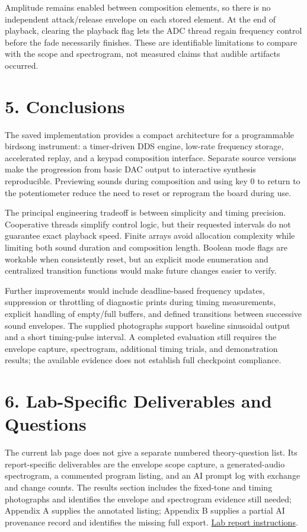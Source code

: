 \documentclass[11pt,letterpaper]{article}
\begin{document}
Amplitude remains enabled between composition elements, so there is no independent attack/release envelope on each stored element. At the end of playback, clearing the playback flag lets the ADC thread regain frequency control before the fade necessarily finishes. These are identifiable limitations to compare with the scope and spectrogram, not measured claims that audible artifacts occurred.

\section*{5. Conclusions}

The saved implementation provides a compact architecture for a programmable birdsong instrument: a timer-driven DDS engine, low-rate frequency storage, accelerated replay, and a keypad composition interface. Separate source versions make the progression from basic DAC output to interactive synthesis reproducible. Previewing sounds during composition and using key 0 to return to the potentiometer reduce the need to reset or reprogram the board during use.

The principal engineering tradeoff is between simplicity and timing precision. Cooperative threads simplify control logic, but their requested intervals do not guarantee exact playback speed. Finite arrays avoid allocation complexity while limiting both sound duration and composition length. Boolean mode flags are workable when consistently reset, but an explicit mode enumeration and centralized transition functions would make future changes easier to verify.

Further improvements would include deadline-based frequency updates, suppression or throttling of diagnostic prints during timing measurements, explicit handling of empty/full buffers, and defined transitions between successive sound envelopes. The supplied photographs support baseline sinusoidal output and a short timing-pulse interval. A completed evaluation still requires the envelope capture, spectrogram, additional timing trials, and demonstration results; the available evidence does not establish full checkpoint compliance.

\section*{6. Lab-Specific Deliverables and Questions}

The current lab page does not give a separate numbered theory-question list. Its report-specific deliverables are the envelope scope capture, a generated-audio spectrogram, a commented program listing, and an AI prompt log with exchange and change counts. The results section includes the fixed-tone and timing photographs and identifies the envelope and spectrogram evidence still needed; Appendix A supplies the annotated listing; Appendix B supplies a partial AI provenance record and identifies the missing full export. \href{https://vanhunteradams.com/Pico/Birds/Birdsong.html}{Lab report instructions}.
\end{document}
